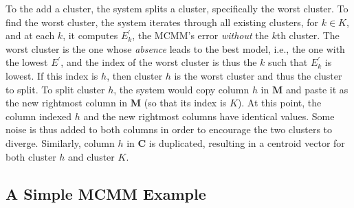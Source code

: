 {To the add a cluster, the system splits a cluster, specifically the worst cluster. 
To find the worst cluster, 
 the system iterates through all existing clusters, for $k \in K$, and at each $k$, 
it computes $E^{\prime}_{k}$, the MCMM's error \emph{without} the 
 $k$th cluster.  The worst cluster is the one whose \emph{absence} leads to the best model, 
 i.e., the one with the lowest $E^{\prime}$, and the index of the worst cluster is thus the 
 $k$ such that $E^{\prime}_{k}$ is lowest. If this index is $h$, then cluster $h$ is the 
 worst cluster and thus the cluster to split. To split cluster $h$, 
 the system would copy column $h$ in $\textbf{M}$ and paste it as the new 
 rightmost column in $\textbf{M}$ (so that its index is $K$).  At this point, 
 the column indexed $h$ and the new rightmost columns have identical values.  
 Some noise is thus added to both columns in order to encourage the two clusters to diverge. 
 Similarly, column $h$ in $\textbf{C}$ is duplicated, resulting in a centroid vector 
 for both cluster $h$ and cluster $K$.
 
  

\subsection{A Simple MCMM Example}
\label{subsec:example}

}
